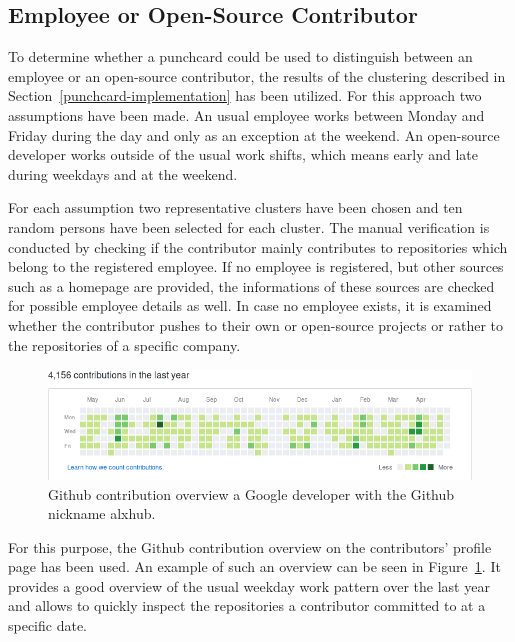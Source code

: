 \subsection{Employee or Open-Source Contributor}
To determine whether a punchcard could be used to distinguish between an employee or an open-source contributor, the results of the clustering described in Section~\ref{punchcard-implementation} has been utilized.
For this approach two assumptions have been made.
An usual employee works between Monday and Friday during the day and only as an exception at the weekend.
An open-source developer works outside of the usual work shifts, which means early and late during weekdays and at the weekend.

For each assumption two representative clusters have been chosen and ten random persons have been selected for each cluster.
The manual verification is conducted by checking if the contributor mainly contributes to repositories which belong to the registered employee.
If no employee is registered, but other sources such as a homepage are provided, the informations of these sources are checked for possible employee details as well.
In case no employee exists, it is examined whether the contributor pushes to their own or open-source projects or rather to the repositories of a specific company.

\begin{figure}[H]
    \includegraphics[scale=0.6]{./graphs/contribution-overview-alxhub}
    \centering
    \caption{Github contribution overview a Google developer with the Github nickname alxhub.}\label{fig:github-contribution-overview}
\end{figure}

For this purpose, the Github contribution overview on the contributors' profile page has been used.
An example of such an overview can be seen in Figure~\ref{fig:github-contribution-overview}.
It provides a good overview of the usual weekday work pattern over the last year and allows to quickly inspect the repositories a contributor committed to at a specific date.

